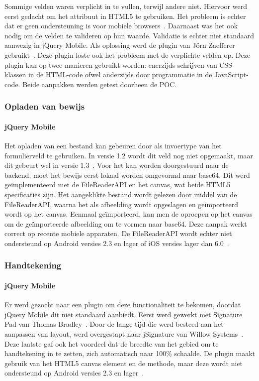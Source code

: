 Sommige velden waren verplicht in te vullen, terwijl andere niet. Hiervoor werd eerst gedacht om het  attribuut in HTML5 te gebruiken. Het probleem is echter dat er geen ondersteuning is voor mobiele browsers~\cite{Deveria2013}. Daarnaast was het ook nodig om de velden te valideren op hun waarde. Validatie is echter niet standaard aanwezig in jQuery Mobile. Als oplossing werd de plugin van Jörn Zaefferer gebruikt~\cite{Zaefferer2013}. Deze plugin loste ook het probleem met de verplichte velden op. Deze plugin kan op twee manieren gebruikt worden: enerzijds schrijven van CSS klassen in de HTML-code ofwel anderzijds door programmatie in de JavaScript-code. Beide aanpakken werden getest doorheen de POC. 

\subsubsection{Opladen van bewijs}

\paragraph{jQuery Mobile} 
Het opladen van een bestand kan gebeuren door  als invoertype van het formulierveld te gebruiken. In versie 1.2 wordt dit veld nog niet opgemaakt, maar dit gebeurt wel in versie 1.3~\cite{JQuery2013d}. Voor het kan worden doorgestuurd naar de backend, moet het bewijs eerst lokaal worden omgevormd naar base64. Dit werd geïmplementeerd met de FileReaderAPI en het canvas, wat beide HTML5 specificaties zijn. Het aangeklikte bestand wordt gelezen door middel van de FileReaderAPI, waarna het als afbeelding wordt opgeslagen en geïmporteerd wordt op het canvas. Eenmaal geïmporteerd, kan men de  oproepen op het canvas om de geïmporteerde afbeelding om te vormen naar base64. Deze aanpak werkt correct op recente mobiele apparaten. De FileReaderAPI wordt echter niet ondersteund op Android versies 2.3 en lager of iOS versies lager dan 6.0~\cite{Deveria2013a}.

\subsubsection{Handtekening}

\paragraph{jQuery Mobile} 
Er werd gezocht naar een plugin om deze functionaliteit te bekomen, doordat jQuery Mobile dit niet standaard aanbiedt. Eerst werd gewerkt met Signature Pad van Thomas Bradley~\cite{Bradley2013}. Door de lange tijd die werd besteed aan het aanpassen van layout, werd overgestapt naar jSignature van Willow Systems~\cite{Systems2013}. Deze laatste gaf ook het voordeel dat de breedte van het gebied om te handtekening in te zetten, zich automatisch naar 100\% schaalde. De plugin maakt gebruik van het HTML5 canvas element en de  methode, maar deze wordt niet ondersteund op Android versies 2.3 en lager~\cite{Systems2013}.

